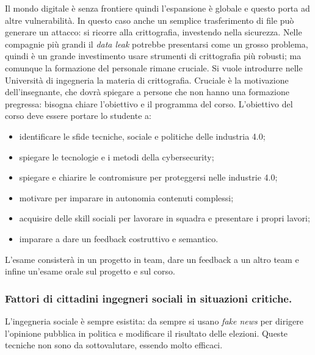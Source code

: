 \documentclass[a4page, 11pt, twocolumn]{article}
\begin{document}
Il mondo digitale è senza frontiere quindi l'espansione è globale e questo porta ad altre vulnerabilità.
In questo caso anche un semplice trasferimento di file può generare un attacco: si ricorre alla crittografia, investendo nella sicurezza.
Nelle compagnie più grandi il \textit{data leak} potrebbe presentarsi come un grosso problema, quindi è un grande investimento usare strumenti di crittografia più robusti; ma comunque la formazione del personale rimane cruciale.
Si vuole introdurre nelle Università di ingegneria la materia di crittografia.
Cruciale è la motivazione dell'insegnante, che dovrà spiegare a persone che non hanno una formazione pregressa: bisogna chiare l'obiettivo e il programma del corso.
L'obiettivo del corso deve essere portare lo studente a:
\begin{itemize}
  \item identificare le sfide tecniche, sociale e politiche delle industria 4.0;
  \item spiegare le tecnologie e i metodi della cybersecurity;
  \item spiegare e chiarire le contromisure per proteggersi nelle industrie 4.0;
  \item motivare per imparare in autonomia contenuti complessi;
  \item acquisire delle skill sociali per lavorare in squadra e presentare i propri lavori;
  \item imparare a dare un feedback costruttivo e semantico.
\end{itemize}
L'esame consisterà in un progetto in team, dare un feedback a un altro team e infine un'esame orale sul progetto e sul corso.

\subsubsection{Fattori di cittadini ingegneri sociali in situazioni critiche.}
L'ingegneria sociale è sempre esistita: da sempre si usano \textit{fake news} per dirigere l'opinione pubblica in politica e modificare il risultato delle elezioni.
Queste tecniche non sono da sottovalutare, essendo molto efficaci.
\end{document}

